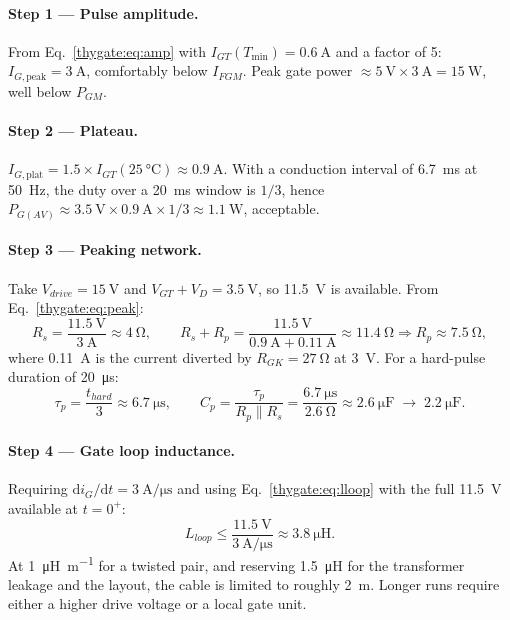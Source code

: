\paragraph{Step 1 --- Pulse amplitude.}
From Eq.~\eqref{thygate:eq:amp} with $I_{GT}(T_{\min}) = \SI{0.6}{\ampere}$ and a factor of
5: $I_{G,\text{peak}} = \SI{3}{\ampere}$, comfortably below $I_{FGM}$.
Peak gate power $\approx \SI{5}{\volt}\times\SI{3}{\ampere} = \SI{15}{\watt}$,
well below $P_{GM}$.

\paragraph{Step 2 --- Plateau.}
$I_{G,\text{plat}} = 1.5\times I_{GT}(\SI{25}{\celsius}) \approx
\SI{0.9}{\ampere}$. With a conduction interval of \SI{6.7}{\milli\second} at
\SI{50}{\hertz}, the duty over a \SI{20}{\milli\second} window is $1/3$, hence
$P_{G(AV)} \approx \SI{3.5}{\volt}\times\SI{0.9}{\ampere}\times 1/3 \approx
\SI{1.1}{\watt}$, acceptable.

\paragraph{Step 3 --- Peaking network.}
Take $V_{drive} = \SI{15}{\volt}$ and $V_{GT}+V_{D} = \SI{3.5}{\volt}$, so
\SI{11.5}{\volt} is available. From Eq.~\eqref{thygate:eq:peak}:
\[
  R_s = \frac{\SI{11.5}{\volt}}{\SI{3}{\ampere}} \approx \SI{4}{\ohm},
  \qquad
  R_s + R_p = \frac{\SI{11.5}{\volt}}{\SI{0.9}{\ampere} + \SI{0.11}{\ampere}}
  \approx \SI{11.4}{\ohm} \Rightarrow R_p \approx \SI{7.5}{\ohm},
\]
where \SI{0.11}{\ampere} is the current diverted by $R_{GK} = \SI{27}{\ohm}$ at
\SI{3}{\volt}. For a hard-pulse duration of \SI{20}{\micro\second}:
\[
  \tau_p = \frac{t_{hard}}{3} \approx \SI{6.7}{\micro\second},
  \qquad
  C_p = \frac{\tau_p}{R_p \parallel R_s}
      = \frac{\SI{6.7}{\micro\second}}{\SI{2.6}{\ohm}} \approx \SI{2.6}{\micro\farad}
      \;\rightarrow\; \SI{2.2}{\micro\farad}.
\]

\paragraph{Step 4 --- Gate loop inductance.}
Requiring $\mathrm{d}i_G/\mathrm{d}t = \SI{3}{\ampere\per\micro\second}$ and using
Eq.~\eqref{thygate:eq:lloop} with the full \SI{11.5}{\volt} available at $t=0^+$:
\[
  L_{loop} \le \frac{\SI{11.5}{\volt}}{\SI{3}{\ampere\per\micro\second}}
  \approx \SI{3.8}{\micro\henry}.
\]
At \SI{1}{\micro\henry\per\metre} for a twisted pair, and reserving
\SI{1.5}{\micro\henry} for the transformer leakage and the layout, the cable is
limited to roughly \SI{2}{\metre}. Longer runs require either a higher drive
voltage or a local gate unit.

